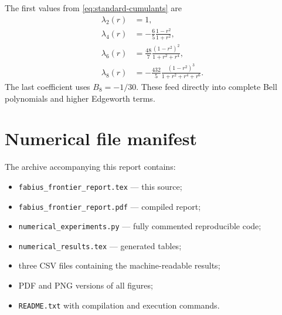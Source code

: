\documentclass[11pt]{article}
\theoremstyle{definition}
\begin{document}
The first values from \cref{eq:standard-cumulants} are
\begin{align*}
 \lambda_2(r)&=1,\\
 \lambda_4(r)&=-\frac65\frac{1-r^2}{1+r^2},\\
 \lambda_6(r)&=\frac{48}{7}\frac{(1-r^2)^2}{1+r^2+r^4},\\
 \lambda_8(r)&=-\frac{432}{5}
 \frac{(1-r^2)^3}{1+r^2+r^4+r^6}.
\end{align*}
The last coefficient uses \(B_8=-1/30\).  These feed directly into complete Bell
polynomials and higher Edgeworth terms.

\section{Numerical file manifest}

The archive accompanying this report contains:
\begin{itemize}[leftmargin=2.2em]
\item \texttt{fabius\_frontier\_report.tex} --- this source;
\item \texttt{fabius\_frontier\_report.pdf} --- compiled report;
\item \texttt{numerical\_experiments.py} --- fully commented reproducible code;
\item \texttt{numerical\_results.tex} --- generated tables;
\item three CSV files containing the machine-readable results;
\item PDF and PNG versions of all figures;
\item \texttt{README.txt} with compilation and execution commands.
\end{itemize}
\end{document}
